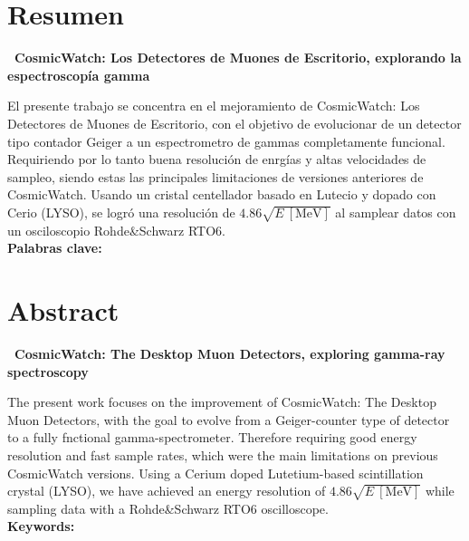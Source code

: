 \newpage
\chapter*{Resumen}
%
\textbf{\Huge \ CosmicWatch: Los Detectores de Muones de Escritorio, explorando la espectroscopía gamma}
\vspace{.5cm}
\par El presente trabajo se concentra en el mejoramiento de CosmicWatch: Los Detectores de Muones de Escritorio, con el objetivo de evolucionar de un detector tipo contador Geiger a un espectrometro de gammas completamente funcional. Requiriendo por lo tanto buena resolución de enrgías y altas velocidades de sampleo, siendo estas las principales limitaciones de versiones anteriores de CosmicWatch. Usando un cristal centellador basado en Lutecio y dopado con Cerio (LYSO), se logró una resolución de $4.86 \sqrt{E~[\unit{\MeV}]}$ al samplear datos con un osciloscopio Rohde\&Schwarz RTO6.
\\[2cm]
\textbf{Palabras clave:} \palabrasclave

\newpage 
\chapter*{Abstract}
%
\textbf{\Huge \ CosmicWatch: The Desktop Muon Detectors, exploring gamma-ray spectroscopy}
\vspace{.5cm}
\par The present work focuses on the improvement of CosmicWatch: The Desktop Muon Detectors, with the goal to evolve from a Geiger-counter type of detector to a fully fnctional gamma-spectrometer. Therefore requiring good energy resolution and fast sample rates, which were the main limitations on previous CosmicWatch versions. Using a Cerium doped Lutetium-based scintillation crystal (LYSO), we have achieved an energy resolution of $4.86 \sqrt{E~[\unit{\MeV}]}$ while sampling data with a Rohde\&Schwarz RTO6 oscilloscope.
\\[2cm]
\textbf{Keywords:} \keywords

